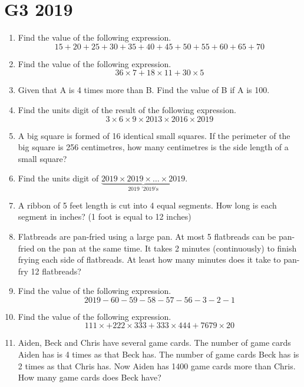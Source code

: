 \documentclass[11pt]{scrartcl}
\begin{document}
\section{G3 2019}
\begin{enumerate}
    \item Find the value of the following expression.
    \[15 + 20 + 25 + 30 + 35 + 40 + 45 + 50 + 55 + 60 + 65 + 70\]
    
    \item Find the value of the following expression.
    \[36 \times 7 + 18 \times 11 + 30 \times 5\]
    
    \item Given that A is 4 times more than B. Find the value of B if A is 100.
    
    \item Find the units digit of the result of the following expression.
    \[3 \times 6 \times 9 \times 2013 \times 2016 \times 2019\]
    
    \item A big square is formed of 16 identical small squares. If the perimeter of the big square is 256 centimetres, how many centimetres is the side length of a small square?
    
    \item Find the units digit of $\underbrace{2019 \times 2019 \times \ldots \times 2019}_{2019 \text{ '2019's}}$.
    
    \item A ribbon of 5 feet length is cut into 4 equal segments. How long is each segment in inches? (1 foot is equal to 12 inches)
    
    \item Flatbreads are pan-fried using a large pan. At most 5 flatbreads can be pan-fried on the pan at the same time. It takes 2 minutes (continuously) to finish frying each side of flatbreads. At least how many minutes does it take to pan-fry 12 flatbreads?
    
    \item Find the value of the following expression.
    \[2019 - 60 - 59 - 58 - 57 - 56 - 3 - 2 - 1\]
    
    \item Find the value of the following expression.
    \[111 \times  + 222 \times 333 + 333 \times 444 + 7679 \times 20\]
    
    \item Aiden, Beck and Chris have several game cards. The number of game cards Aiden has is 4 times as that Beck has. The number of game cards Beck has is 2 times as that Chris has. Now Aiden has 1400 game cards more than Chris. How many game cards does Beck have?
    

\end{enumerate}
\end{document}
